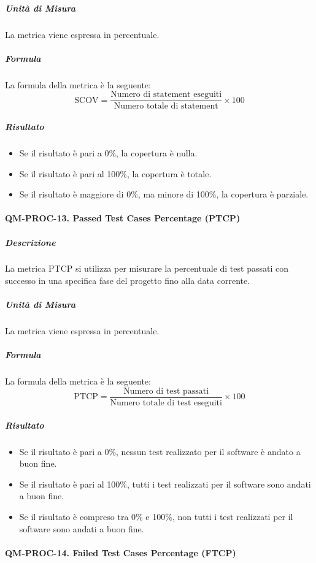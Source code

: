 			\subparagraph{Unità di Misura}
			La metrica viene espressa in percentuale.

			\subparagraph{Formula}
			La formula della metrica è la seguente:
			\[
				\text{SCOV} = \frac{\text{Numero di statement eseguiti}}{\text{Numero totale di statement}} \times 100
			\]

			\subparagraph{Risultato}
			\begin{itemize}
				\item Se il risultato è pari a 0\%, la copertura è nulla.
				\item Se il risultato è pari al 100\%, la copertura è totale.
				\item Se il risultato è maggiore di 0\%, ma minore di 100\%, la copertura è parziale.
			\end{itemize}

		\paragraph{QM-PROC-13. Passed Test Cases Percentage (PTCP)}

			\subparagraph{Descrizione}
			La metrica PTCP si utilizza per misurare la percentuale di test passati con successo in una specifica fase del progetto fino alla data corrente. 

			\subparagraph{Unità di Misura}
			La metrica viene espressa in percentuale.

			\subparagraph{Formula}
			La formula della metrica è la seguente:
			\[
				\text{PTCP} = \frac{\text{Numero di test passati}}{\text{Numero totale di test eseguiti}} \times 100
			\]

			\subparagraph{Risultato}
			\begin{itemize}
				\item Se il risultato è pari a 0\%, nessun test realizzato per il software è andato a buon fine.
				\item Se il risultato è pari al 100\%, tutti i test realizzati per il software sono andati a buon fine.
				\item Se il risultato è compreso tra 0\% e 100\%, non tutti i test realizzati per il software sono andati a buon fine.
			\end{itemize}

		\paragraph{QM-PROC-14. Failed Test Cases Percentage (FTCP)}

